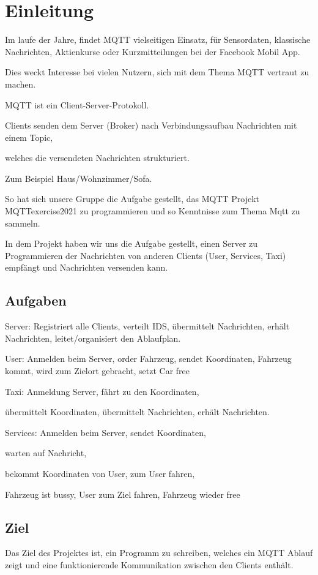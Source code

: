 \section{Einleitung}


Im laufe der Jahre, findet MQTT vielseitigen Einsatz, für Sensordaten, 
klassische Nachrichten, Aktienkurse oder Kurzmitteilungen bei der Facebook Mobil App.


Dies weckt Interesse bei vielen Nutzern, 
sich mit dem Thema MQTT vertraut zu machen.

MQTT ist ein Client-Server-Protokoll.
 

Clients senden dem Server (Broker) 
nach Verbindungsaufbau Nachrichten mit einem Topic, 

welches die versendeten Nachrichten strukturiert. 

Zum Beispiel Haus/Wohnzimmer/Sofa.


So hat sich unsere Gruppe die Aufgabe gestellt, 
das MQTT Projekt MQTTexercise2021 zu 
programmieren und so Kenntnisse zum Thema Mqtt zu sammeln.

In dem Projekt haben wir uns die Aufgabe gestellt, 
einen Server zu Programmieren der Nachrichten von anderen Clients (User, Services, Taxi) empfängt und Nachrichten versenden kann.


\subsection{Aufgaben}

Server: Registriert alle Clients, verteilt IDS, übermittelt Nachrichten, 
erhält Nachrichten, leitet/organisiert den Ablaufplan.


User: Anmelden beim Server, order Fahrzeug, sendet Koordinaten, Fahrzeug kommt, wird zum Zielort gebracht, setzt Car free


Taxi: Anmeldung Server, fährt zu den Koordinaten, 

übermittelt Koordinaten, übermittelt Nachrichten, erhält Nachrichten.


Services: Anmelden beim Server, sendet Koordinaten, 

warten auf Nachricht, 

bekommt Koordinaten von User, zum User fahren, 

Fahrzeug ist  bussy, User zum Ziel fahren, Fahrzeug wieder free

\subsection{Ziel}

Das Ziel des Projektes ist, ein Programm zu schreiben, welches ein MQTT Ablauf zeigt und eine funktionierende Kommunikation zwischen den Clients enthält.

